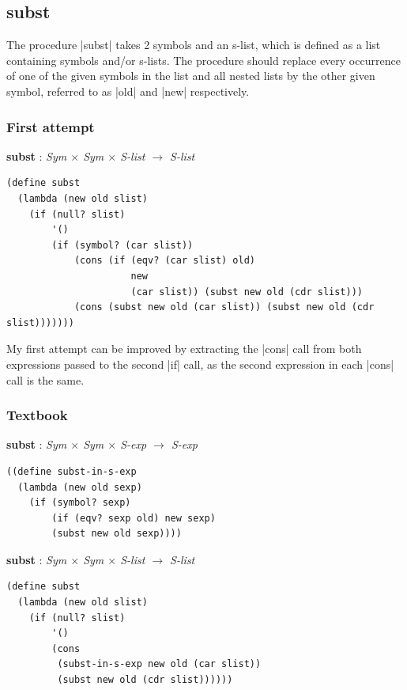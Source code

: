 \documentclass[a4paper]{article}
\begin{document}
\subsection{subst}

The procedure |subst| takes 2 symbols and an s-list, which is defined as a list containing symbols and/or s-lists. The procedure should replace every occurrence of one of the given symbols in the list and all nested lists by the other given symbol, referred to as |old| and |new| respectively.

\subsubsection*{First attempt}

\textbf{subst} : \textit{Sym $\times$ Sym $\times$ S-list $\rightarrow$ S-list}
\begin{lstlisting}[aboveskip=0pt]
(define subst
  (lambda (new old slist)
    (if (null? slist)
        '()
        (if (symbol? (car slist))
            (cons (if (eqv? (car slist) old)
                      new
                      (car slist)) (subst new old (cdr slist)))
            (cons (subst new old (car slist)) (subst new old (cdr slist)))))))
\end{lstlisting}

My first attempt can be improved by extracting the |cons| call from both expressions passed to the second |if| call, as the second expression in each |cons| call is the same.

\subsubsection*{Textbook}

\textbf{subst} : \textit{Sym $\times$ Sym $\times$ S-exp $\rightarrow$ S-exp}
\begin{lstlisting}[aboveskip=0pt]
((define subst-in-s-exp
  (lambda (new old sexp)
    (if (symbol? sexp)
        (if (eqv? sexp old) new sexp)
        (subst new old sexp))))
\end{lstlisting}

\textbf{subst} : \textit{Sym $\times$ Sym $\times$ S-list $\rightarrow$ S-list}
\begin{lstlisting}[aboveskip=0pt]
(define subst
  (lambda (new old slist)
    (if (null? slist)
        '()
        (cons
         (subst-in-s-exp new old (car slist))
         (subst new old (cdr slist))))))
\end{lstlisting}
\end{document}
